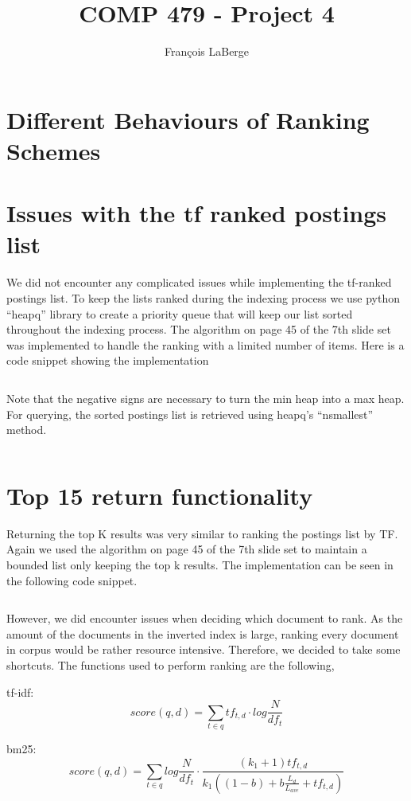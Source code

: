 \documentclass[]{article}
\title{COMP 479 - Project 4}
\author{François LaBerge}
\begin{document}
\maketitle

\section{Different Behaviours of Ranking Schemes}
\section{Issues with the tf ranked postings list}
We did not encounter any complicated issues while implementing the tf-ranked postings list. To keep the lists ranked during the indexing process we use python ``heapq'' library to create a priority queue that will keep our list sorted throughout the indexing process. The algorithm on page 45 of the 7th slide set was implemented to handle the ranking with a limited number of items. Here is a code snippet showing the implementation

\inputminted[]{python}{snip/tfranked.py}

Note that the negative signs are necessary to turn the min heap into a max heap. For querying, the sorted postings list is retrieved using heapq's ``nsmallest'' method. 

\inputminted[]{python}{snip/tfretrieve.py}

\section{Top 15 return functionality}
Returning the top K results was very similar to ranking the postings list by TF. Again we used the algorithm on page 45 of the 7th slide set to maintain a bounded list only keeping the top k results. The implementation can be seen in the following code snippet.
 
\inputminted[]{python}{snip/topklist.py} 

However, we did encounter issues when deciding which document to rank. As the amount of the documents in the inverted index is large, ranking every document in corpus would be rather resource intensive. Therefore, we decided to take some shortcuts. The functions used to perform ranking are the following,

tf-idf:
\[ score(q,d) = \sum_{t \in q}^{} tf_{t,d} \cdot log\frac{N}{df_t} \]

bm25:
\[ score(q,d) = \sum_{t \in q}^{} log\frac{N}{df_t} \cdot \frac{(k_1+1)tf_{t,d}}{k_1((1-b) + b\frac{L_d}{L_{ave}} + tf_{t,d})} \]
\end{document}
